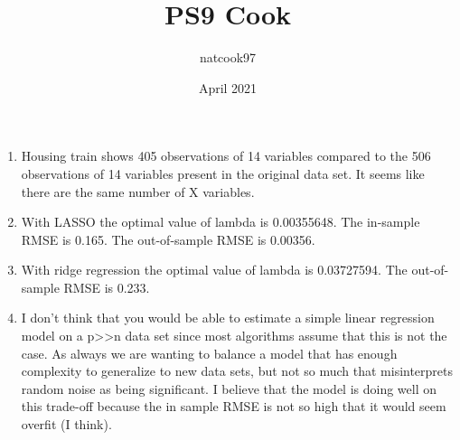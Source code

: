 \documentclass{article}
\begin{document}
\title{PS9 Cook}
\author{natcook97 }
\date{April 2021}



\begin{enumerate}
    \item Housing train shows 405 observations of 14 variables compared to the 506 observations of 14 variables present in the original data set. It seems like there are the same number of X variables. 
    
    \item With LASSO the optimal value of lambda is 0.00355648. The in-sample RMSE is 0.165. The out-of-sample RMSE is 0.00356. 
    
    \item With ridge regression the optimal value of lambda is 0.03727594. The out-of-sample RMSE is 0.233.
    
    \item I don't think that you would be able to estimate a simple linear regression model on a p>>n data set since most algorithms assume that this is not the case. As always we are wanting to balance a model that has enough complexity to generalize to new data sets, but not so much that misinterprets random noise as being significant. I believe that the model is doing well on this trade-off because the in sample RMSE is not so high that it would seem overfit (I think). 
\end{enumerate}
\end{document}

